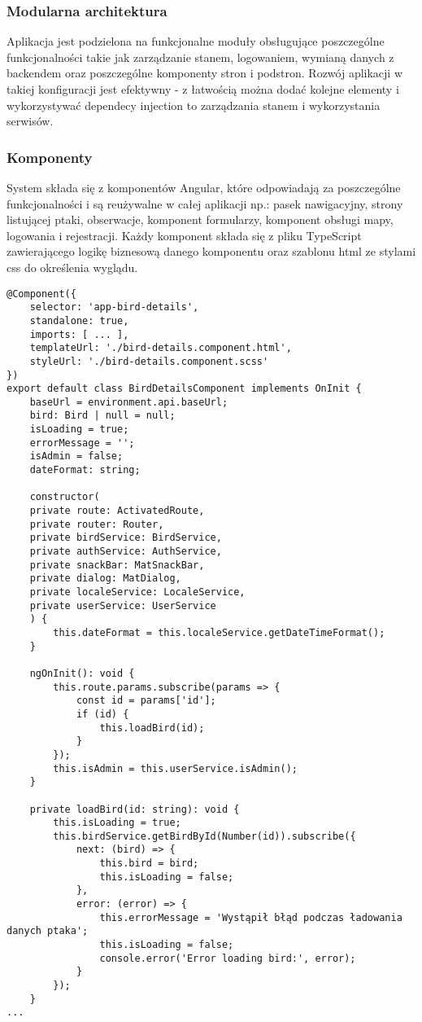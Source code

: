 \subsubsection{Modularna architektura}
Aplikacja jest podzielona na funkcjonalne moduły obsługujące poszczególne funkcjonalności takie jak zarządzanie stanem, logowaniem, wymianą danych z backendem oraz poszczególne komponenty stron i podstron.
Rozwój aplikacji w takiej konfiguracji jest efektywny - z łatwością można dodać kolejne elementy i wykorzystywać dependecy injection to zarządzania stanem i wykorzystania serwisów.

\subsubsection{Komponenty}
System składa się z komponentów Angular, które odpowiadają za poszczególne funkcjonalności i są reużywalne w całej aplikacji np.: pasek nawigacyjny, strony listującej ptaki, obserwacje, komponent formularzy, komponent obsługi mapy, logowania i rejestracji.
Każdy komponent składa się z pliku TypeScript zawierającego logikę biznesową danego komponentu oraz szablonu html ze stylami css do określenia wyglądu.

\begin{lstlisting}[style=tsstyle, caption={Fragment kodu TypeScript komponentu}]
@Component({
	selector: 'app-bird-details',
	standalone: true,
	imports: [ ... ],
	templateUrl: './bird-details.component.html',
	styleUrl: './bird-details.component.scss'
})
export default class BirdDetailsComponent implements OnInit {
	baseUrl = environment.api.baseUrl;
	bird: Bird | null = null;
	isLoading = true;
	errorMessage = '';
	isAdmin = false;
	dateFormat: string;
	
	constructor(
	private route: ActivatedRoute,
	private router: Router,
	private birdService: BirdService,
	private authService: AuthService,
	private snackBar: MatSnackBar,
	private dialog: MatDialog,
	private localeService: LocaleService,
	private userService: UserService
	) {
		this.dateFormat = this.localeService.getDateTimeFormat();
	}
	
	ngOnInit(): void {
		this.route.params.subscribe(params => {
			const id = params['id'];
			if (id) {
				this.loadBird(id);
			}
		});
		this.isAdmin = this.userService.isAdmin();
	}
	
	private loadBird(id: string): void {
		this.isLoading = true;
		this.birdService.getBirdById(Number(id)).subscribe({
			next: (bird) => {
				this.bird = bird;
				this.isLoading = false;
			},
			error: (error) => {
				this.errorMessage = 'Wystąpił błąd podczas ładowania danych ptaka';
				this.isLoading = false;
				console.error('Error loading bird:', error);
			}
		});
	}
...
\end{lstlisting}

